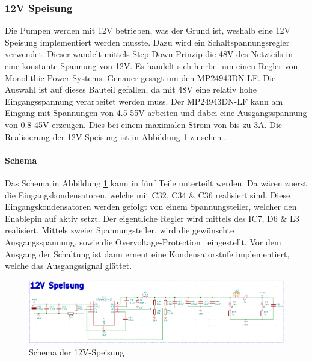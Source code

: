 \subsubsection{12V Speisung}
\label{subsubsec:12V Speisung}

Die Pumpen werden mit 12V betrieben, was der Grund ist, weshalb eine 12V Speisung implementiert werden musste. Dazu wird ein Schaltspannungsregler verwendet. Dieser wandelt mittels Step-Down-Prinzip die 48V des Netzteils in eine konstante Spannung von 12V. Es handelt sich hierbei um einen Regler von Monolithic Power Systems. Genauer gesagt um den MP24943DN-LF. Die Auswahl ist auf dieses Bauteil gefallen, da mit 48V eine relativ hohe Eingangsspannung verarbeitet werden muss. Der MP24943DN-LF kann am Eingang mit Spannungen von 4.5-55V arbeiten und dabei eine Ausgangsspannung von 0.8-45V erzeugen. Dies bei einem maximalen Strom von bis zu 3A. Die Realisierung der 12V Speisung ist in Abbildung \ref{fig:Schema_Speisung_12V} zu sehen  \cite{aiyimaindustrial_store_us_nodate} \cite{mouser_mp24943dn-lf_nodate} \cite[S.355-370]{atmel_atmel_2014}. \\


\paragraph{Schema}\mbox{}

Das Schema in Abbildung \ref{fig:Schema_Speisung_12V} kann in fünf Teile unterteilt werden. Da wären zuerst die Eingangskondensatoren, welche mit C32, C34 \& C36 realisiert sind. Diese Eingangskondensatoren werden gefolgt von einem Spannungsteiler, welcher den Enablepin auf aktiv setzt. Der eigentliche Regler wird mittels des IC7, D6 \& L3 realisiert. Mittels zweier Spannungsteiler, wird die gewünschte Ausgangsspannung, sowie die \flqq Overvoltage-Protection\frqq~ eingestellt. Vor dem Ausgang der Schaltung ist dann erneut eine Kondensatorstufe implementiert, welche das Ausgangssignal glättet. \cite{mouser_mp24943dn-lf_nodate}

\begin{figure}[h!]
	\centering
	\includegraphics[width=\textwidth]{graphics/Schema_Speisung_12V.png}
	\caption{Schema der 12V-Speisung}
	\label{fig:Schema_Speisung_12V}
\end{figure} 

